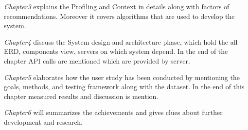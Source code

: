 \textit{Chapter3} explains the Profiling and Context in details along with factors of recommendations. Moreover it covers algorithms that are used to develop the system.\newline

\textit{Chapter4} discuss the System design and architecture phase, which hold the all ERD, components view, servers on which system depend. In the end of the chapter API calls are mentioned which are provided by server.\newline

\textit{Chapter5} elaborates how the user study has been conducted by mentioning the goals, methods, and testing framework along with the dataset. In the end of this chapter measured results and discussion is mention.\newline
  
\textit{Chapter6} will summarizes the achievements and gives clues about further development and research.\newline
